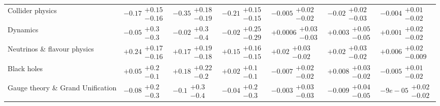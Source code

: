 \begin{table}[H]
\begin{tabular}{lllllll}
Collider physics                          &    $\bm{-0.17}\substack{+0.15 \\ -0.16}$ &    $\bm{-0.35}\substack{+0.18 \\ -0.19}$ &    $\bm{-0.21}\substack{+0.15 \\ -0.15}$ &        $-0.005\substack{+0.02 \\ -0.02}$ &    $\bm{-0.02}\substack{+0.02 \\ -0.03}$ &        $-0.004\substack{+0.01 \\ -0.02}$ \\
Dynamics                                  &           $-0.05\substack{+0.3 \\ -0.3}$ &           $-0.02\substack{+0.3 \\ -0.4}$ &         $-0.02\substack{+0.25 \\ -0.29}$ &       $+0.0006\substack{+0.03 \\ -0.03}$ &        $+0.003\substack{+0.05 \\ -0.05}$ &        $+0.001\substack{+0.02 \\ -0.02}$ \\
Neutrinos \& flavour physics              &    $\bm{+0.24}\substack{+0.17 \\ -0.16}$ &         $+0.17\substack{+0.19 \\ -0.18}$ &    $\bm{+0.15}\substack{+0.16 \\ -0.15}$ &         $+0.02\substack{+0.03 \\ -0.02}$ &         $+0.02\substack{+0.03 \\ -0.02}$ &       $+0.006\substack{+0.02 \\ -0.009}$ \\
Black holes                               &           $+0.05\substack{+0.2 \\ -0.1}$ &          $+0.18\substack{+0.22 \\ -0.2}$ &           $+0.02\substack{+0.1 \\ -0.1}$ &        $-0.007\substack{+0.02 \\ -0.02}$ &        $+0.008\substack{+0.03 \\ -0.02}$ &        $-0.005\substack{+0.01 \\ -0.02}$ \\
Gauge theory \& Grand Unification         &           $-0.08\substack{+0.2 \\ -0.3}$ &            $-0.1\substack{+0.3 \\ -0.4}$ &           $-0.04\substack{+0.2 \\ -0.3}$ &        $-0.003\substack{+0.03 \\ -0.03}$ &        $-0.009\substack{+0.04 \\ -0.05}$ &        $-9e-05\substack{+0.02 \\ -0.02}$ \\

\end{tabular}
\end{table}
